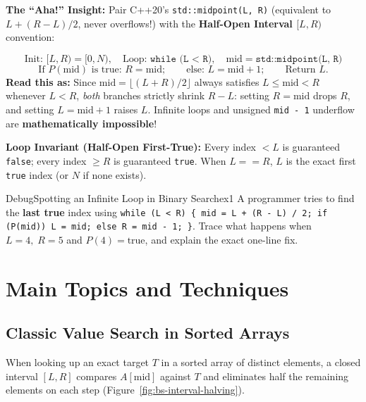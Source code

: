 \documentclass[11pt,a4paper]{article}
\theoremstyle{definition}
\newcommand{\ahabeat}{\textbf{\color{accentteal}The ``Aha!'' Insight:} }
\newcommand{\invariantbeat}[1]{\par\noindent\textbf{\color{accentteal}Loop Invariant (#1):} }
\begin{document}
\ahabeat Pair C++20's \texttt{std::midpoint(L, R)} (equivalent to $L + (R - L)/2$, never overflows!) with the \textbf{Half-Open Interval $[L, R)$} convention:

\begin{formulabox}[The Half-Open $[L, R)$ First-True Invariant]
$$\text{Init: } [L, R) = [0, N), \quad \text{Loop: } \texttt{while (L < R)}, \quad \text{mid} = \texttt{std::midpoint(L, R)}$$
$$\text{If } P(\text{mid}) \text{ is true: } R = \text{mid}; \qquad \text{else: } L = \text{mid} + 1; \qquad \text{Return } L.$$
\textbf{Read this as:} Since $\text{mid} = \lfloor (L + R) / 2 \rfloor$ always satisfies $L \le \text{mid} < R$ whenever $L < R$, \emph{both} branches strictly shrink $R - L$: setting $R = \text{mid}$ drops $R$, and setting $L = \text{mid} + 1$ raises $L$. Infinite loops and unsigned \texttt{mid - 1} underflow are \textbf{mathematically impossible}!
\end{formulabox}

\invariantbeat{Half-Open First-True} Every index $< L$ is guaranteed \texttt{false}; every index $\ge R$ is guaranteed \texttt{true}. When $L == R$, $L$ is the exact first \texttt{true} index (or $N$ if none exists).

\begin{tryitbox}{Debug}{Spotting an Infinite Loop in Binary Search}{ex1}
A programmer tries to find the \textbf{last true} index using \texttt{while (L < R) \{ mid = L + (R - L) / 2; if (P(mid)) L = mid; else R = mid - 1; \}}. Trace what happens when $L = 4,\; R = 5$ and $P(4) = \text{true}$, and explain the exact one-line fix.
\end{tryitbox}

\section{Main Topics and Techniques}

\subsection{Classic Value Search in Sorted Arrays}

When looking up an exact target $T$ in a sorted array of distinct elements, a closed interval $[L, R]$ compares $A[\text{mid}]$ against $T$ and eliminates half the remaining elements on each step (Figure~\ref{fig:bs-interval-halving}).
\end{document}
